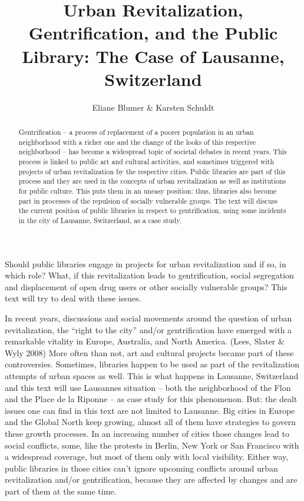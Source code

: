 \documentclass[a4paper,
fontsize=11pt,
oneside,
numbers=noperiodatend,
parskip=half-,
bibliography=totoc,
final
]{scrartcl}
\title{\LARGE{Urban Revitalization, Gentrification, and the Public Library: The Case of Lausanne, Switzerland}} %
\author{Eliane Blumer \& Karsten Schuldt} %
\date{}
\begin{document}
\maketitle
\thispagestyle{fancyplain} 

\begin{abstract}
Gentrification -- a process of replacement of a poorer population in an
urban neighborhood with a richer one and the change of the looks of this
respective neighborhood -- has become a widespread topic of societal
debates in recent years. This process is linked to public art and
cultural activities, and sometimes triggered with projects of urban
revitalization by the respective cities. Public libraries are part of
this process and they are used in the concepts of urban revitalization
as well as institutions for public culture. This puts them in an uneasy
position: thus, libraries also become part in processes of the repulsion
of socially vulnerable groups. The text will discuss the current
position of public libraries in respect to gentrification, using some
incidents in the city of Lausanne, Switzerland, as a case study.
\end{abstract}

Should public libraries engage in projects for urban revitalization and
if so, in which role? What, if this revitalization leads to
gentrification, social segregation and displacement of open drug users
or other socially vulnerable groups? This text will try to deal with
these issues.

In recent years, discussions and social movements around the question of
urban revitalization, the \enquote{right to the city} and/or
gentrification have emerged with a remarkable vitality in Europe,
Australia, and North America. (Lees, Slater \& Wyly 2008) More often
than not, art and cultural projects became part of these controversies.
Sometimes, libraries happen to be used as part of the revitalization
attempts of urban spaces as well. This is what happens in Lausanne,
Switzerland and this text will use Lausannes situation -- both the
neighborhood of the Flon and the Place de la Riponne -- as case study
for this phenomenon. But: the dealt issues one can find in this text are
not limited to Lausanne. Big cities in Europe and the Global North keep
growing, almost all of them have strategies to govern these growth
processes. In an increasing number of cities those changes lead to
social conflicts, some, like the protests in Berlin, New York or San
Francisco with a widespread coverage, but most of them only with local
visibility. Either way, public libraries in those cities can't ignore
upcoming conflicts around urban revitalization and/or gentrification,
because they are affected by changes and are part of them at the same
time.
\end{document}
